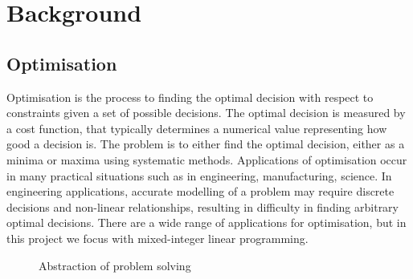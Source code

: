 \chapter{Background}

\section{Optimisation}

Optimisation is the process to finding the optimal decision with respect to constraints given a set of possible decisions. The optimal decision is measured by a cost function, that typically determines a numerical value representing how good a decision is. The problem is to either find the optimal decision, either as a minima or maxima using systematic methods. Applications of optimisation occur in many practical situations such as in engineering, manufacturing, science. In engineering applications, accurate modelling of a problem may require discrete decisions and non-linear relationships, resulting in difficulty in finding arbitrary optimal decisions. There are a wide range of applications for optimisation, but in this project we focus with mixed-integer linear programming.

\begin{figure}[H]
	\begin{center}
	\end{center}
	\caption{Abstraction of problem solving}
\end{figure}

